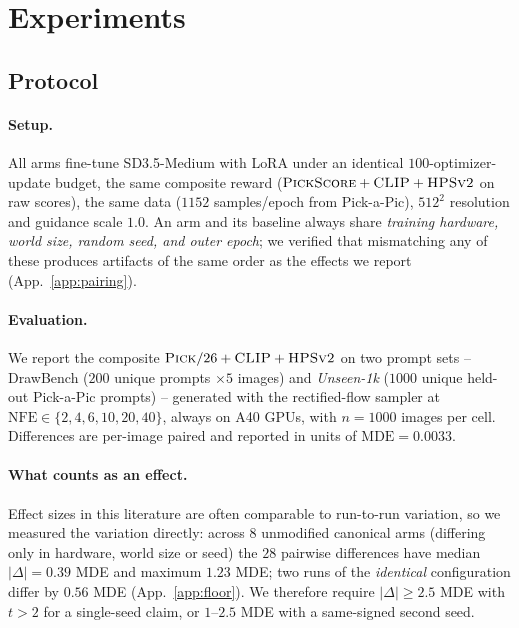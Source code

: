 \section{Experiments}
\label{sec:exp}

\subsection{Protocol}
\label{sec:exp:protocol}

\paragraph{Setup.} All arms fine-tune SD3.5-Medium with LoRA under an identical
$100$-optimizer-update budget, the same composite reward
($\textsc{PickScore}+\textsc{CLIP}+\textsc{HPSv2}$ on raw scores), the same data
($1152$ samples/epoch from Pick-a-Pic), $512^2$ resolution and guidance scale $1.0$.
An arm and its baseline always share \emph{training hardware, world size, random seed, and
outer epoch}; we verified that mismatching any of these produces artifacts of the same
order as the effects we report (App.~\ref{app:pairing}).

\paragraph{Evaluation.} We report the composite $\textsc{Pick}/26+\textsc{CLIP}+\textsc{HPSv2}$
on two prompt sets -- DrawBench ($200$ unique prompts $\times5$ images) and
\emph{Unseen-1k} ($1000$ unique held-out Pick-a-Pic prompts) -- generated with the
rectified-flow sampler at $\mathrm{NFE}\in\{2,4,6,10,20,40\}$, always on A40 GPUs, with
$n\!=\!1000$ images per cell. Differences are per-image paired and reported in units of
$\mathrm{MDE}=0.0033$.

\paragraph{What counts as an effect.} Effect sizes in this literature are often comparable
to run-to-run variation, so we measured the variation directly: across $8$ unmodified
canonical arms (differing only in hardware, world size or seed) the $28$ pairwise
differences have median $|\Delta|=0.39$ MDE and maximum $1.23$ MDE; two runs of the
\emph{identical} configuration differ by $0.56$ MDE (App.~\ref{app:floor}). We therefore
require $|\Delta|\ge2.5$ MDE with $t>2$ for a single-seed claim, or $1$--$2.5$ MDE with a
same-signed second seed.

